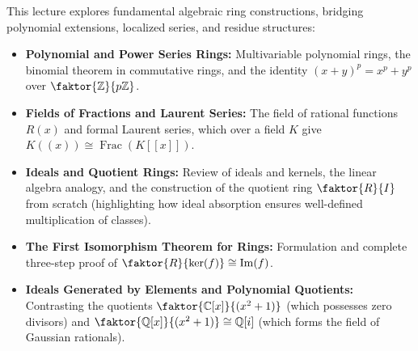


\begin{overview}
This lecture explores fundamental algebraic ring constructions, bridging polynomial extensions, localized series, and residue structures:
\begin{itemize}
    \item \textbf{Polynomial and Power Series Rings:} Multivariable polynomial rings, the binomial theorem in commutative rings, and the identity $(x+y)^p = x^p + y^p$ over $\faktor{\mathbb{Z}}{p\mathbb{Z}}$.
    \item \textbf{Fields of Fractions and Laurent Series:} The field of rational functions $R(x)$ and formal Laurent series, which over a field $K$ give $K((x)) \cong \operatorname{Frac}(K[[x]])$.
    \item \textbf{Ideals and Quotient Rings:} Review of ideals and kernels, the linear algebra analogy, and the construction of the quotient ring $\faktor{R}{I}$ from scratch (highlighting how ideal absorption ensures well-defined multiplication of classes).
    \item \textbf{The First Isomorphism Theorem for Rings:} Formulation and complete three-step proof of $\faktor{R}{\ker(f)} \cong \operatorname{Im}(f)$.
    \item \textbf{Ideals Generated by Elements and Polynomial Quotients:} Contrasting the quotients $\faktor{\mathbb{C}[x]}{(x^2+1)}$ (which possesses zero divisors) and $\faktor{\mathbb{Q}[x]}{(x^2+1)} \cong \mathbb{Q}[i]$ (which forms the field of Gaussian rationals).
\end{itemize}
\end{overview}

